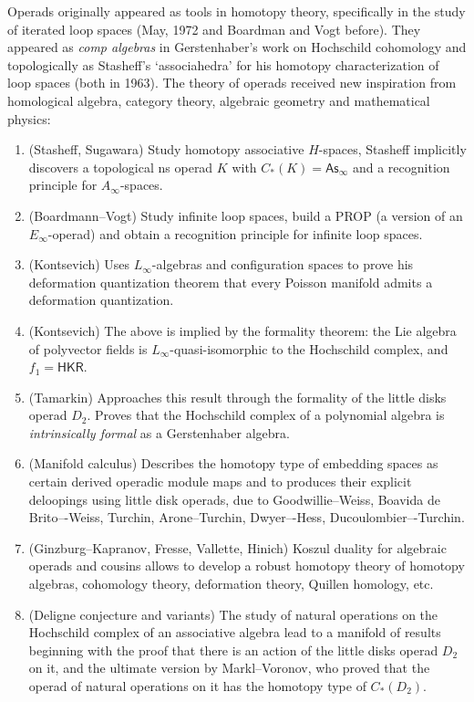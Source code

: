 \documentclass[fleqn,a4paper, twoside]{article}
\newcommand{\0}{\langle 0\rangle}
\newenvironment{tenumerate}{
 \begin{enumerate}
  \setlength{\itemsep}{0pt}
  \setlength{\parskip}{0pt}
}{\end{enumerate}}
\DeclareRobustCommand{\[}{\begin{equation}}%
\DeclareRobustCommand{\]}{\end{equation}}%
\theoremstyle{mytheorem}
\theoremstyle{introthm}
\theoremstyle{mydefinition}
\theoremstyle{mydefinition2}
\theoremstyle{plain} %
\newcommand{\?}{\,?\,}
\theoremstyle{mytheorem}
\theoremstyle{plain} %
\begin{document}
Operads originally appeared as tools in homotopy theory, 
specifically in the study of iterated loop 
spaces (May, 1972 and Boardman and Vogt before).
They appeared as \emph{comp algebras} in Gerstenhaber's 
work on Hochschild cohomology and topologically as 
Stasheff's `associahedra' for his homotopy
characterization of loop spaces (both in 1963).
The theory of operads 
received new inspiration from homological algebra,
category theory, algebraic geometry and mathematical
physics:

\begin{tenumerate}
\item (Stasheff, Sugawara) Study homotopy associative 
$H$-spaces, Stasheff implicitly discovers a topological
ns operad $K$ with $C_*(K) = \mathsf{As}_\infty$ and a
recognition principle for $A_\infty$-spaces.

\item (Boardmann--Vogt) Study infinite loop spaces,
build a PROP (a version of an $E_\infty$-operad) 
and obtain a recognition principle for infinite
loop spaces.

\item (Kontsevich) Uses $L_\infty$-algebras and
configuration spaces to prove his deformation
quantization theorem that every Poisson manifold
admits a deformation quantization.

\item (Kontsevich) The above is
implied by the formality theorem: the
Lie algebra of polyvector fields is 
$L_\infty$-quasi-isomorphic to the Hochschild
complex, and $f_1 = \mathsf{HKR}$. 

\item (Tamarkin) Approaches this result through 
the formality of the little disks operad $D_2$.
Proves that the Hochschild complex of a polynomial
algebra is \emph{intrinsically formal} as a 
Gerstenhaber algebra.

\item (Manifold calculus) Describes the
homotopy type of embedding spaces as certain 
derived operadic module maps and to
produces their explicit deloopings
using little disk operads, due to 
Goodwillie--Weiss, Boavida de Brito–-Weiss,
Turchin, Arone--Turchin, Dwyer–-Hess,
Ducoulombier–-Turchin. 

\item (Ginzburg--Kapranov, Fresse,
Vallette, Hinich) Koszul duality for algebraic 
operads and cousins allows to develop a robust 
homotopy theory of homotopy algebras, cohomology
theory, deformation theory, Quillen homology, etc. 

\item (Deligne conjecture and variants) The study
of natural operations on the Hochschild complex
of an associative algebra lead to a manifold of 
results beginning with the proof that there is
an action of the little disks operad $D_2$ on
it, and the ultimate version by Markl--Voronov,
who proved that the operad of natural operations
on it has the homotopy type of $C_*(D_2)$.  
\end{tenumerate}
\end{document}
